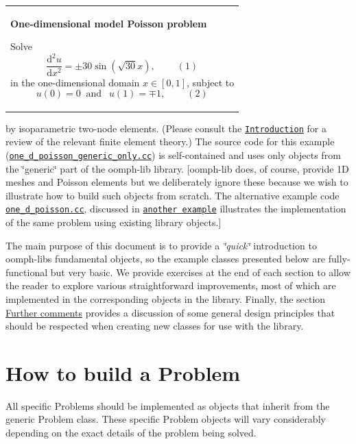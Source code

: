 \begin{center} \tabulinesep=1mm
\begin{longtabu} spread 0pt [c]{*{1}{|X[-1]}|}
\hline
\begin{center} {\bfseries One-\/dimensional model Poisson problem} \end{center}   Solve \[ \frac{\mbox{d}^2u}{\mbox{d}x^2} = \pm 30 \sin(\sqrt{30} x), \ \ \ \ \ \ \ \ \ \ (1) \] in the one-\/dimensional domain $x\in[0,1]$, subject to \[ u(0)=0 \ \mbox{\ \ \ and \ \ \ } \ \ u(1)=\mp 1, \ \ \ \ \ \ \ \ \ \ (2) \]    \\
\end{longtabu}
\end{center} 

by isoparametric two-\/node elements. (Please consult the \href{../../intro/html/index.html}{\tt Introduction} for a review of the relevant finite element theory.) The source code for this example (\href{../../../demo_drivers/poisson/one_d_poisson_generic_only/one_d_poisson_generic_only.cc}{\tt one\+\_\+d\+\_\+poisson\+\_\+generic\+\_\+only.\+cc}) is self-\/contained and uses only objects from the \char`\"{}generic\char`\"{} part of the {\ttfamily oomph-\/lib} library. \mbox{[}{\ttfamily oomph-\/lib} does, of course, provide 1D meshes and Poisson elements but we deliberately ignore these because we wish to illustrate how to build such objects from scratch. The alternative example code \href{../../../demo_drivers/poisson/one_d_poisson/one_d_poisson.cc}{\tt one\+\_\+d\+\_\+poisson.\+cc}, discussed in \href{../../poisson/one_d_poisson/html/index.html}{\tt another example} illustrates the implementation of the same problem using existing library objects.\mbox{]}

The main purpose of this document is to provide a {\itshape \char`\"{}quick\char`\"{}} introduction to {\ttfamily oomph-\/lib\textquotesingle{}s} fundamental objects, so the example classes presented below are fully-\/functional but very basic. We provide exercises at the end of each section to allow the reader to explore various straightforward improvements, most of which are implemented in the corresponding objects in the library. Finally, the section \hyperlink{index_comments}{Further comments} provides a discussion of some general design principles that should be respected when creating new classes for use with the library.



 

\hypertarget{index_problem}{}\section{How to build a Problem}\label{index_problem}
All specific {\ttfamily Problems} should be implemented as objects that inherit from the generic {\ttfamily Problem} class. These specific {\ttfamily Problem} objects will vary considerably depending on the exact details of the problem being solved.

